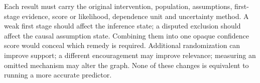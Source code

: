 Each result must carry the original intervention, population, assumptions,
first-stage evidence, score or likelihood, dependence unit and uncertainty
method. A weak first stage should affect the inference state; a disputed
exclusion should affect the causal assumption state. Combining them into
one opaque confidence score would conceal which remedy is required.
Additional randomization can improve support; a different encouragement
may improve relevance; measuring an omitted mechanism may alter the graph.
None of these changes is equivalent to running a more accurate predictor.
